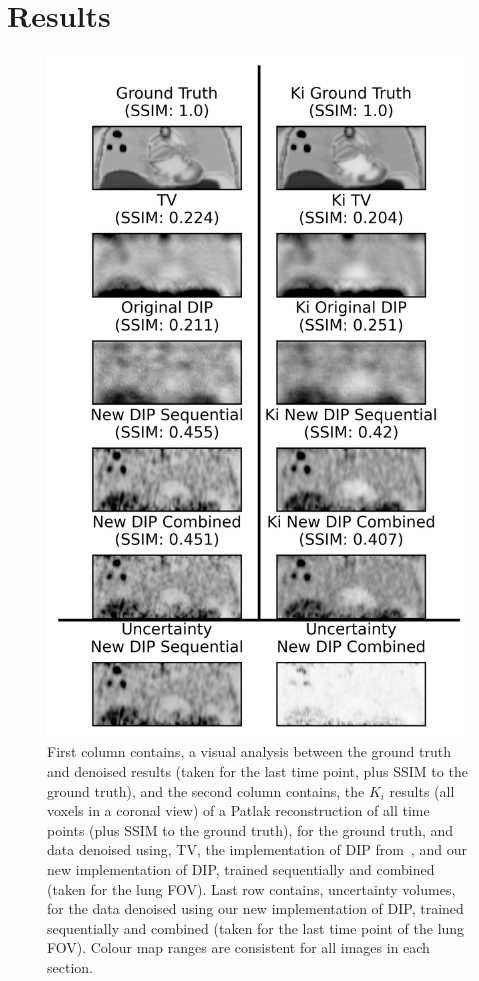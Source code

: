     \section{Results} \label{sec:pseudo_bayesian_dip_denoising_as_a_preprocessing_step_for_kinetic_modelling_in_dynamic_pet_appendix_results}
        \begin{figure}
            \centering
            
            \includegraphics[width=0.7\linewidth]{figures/deep_image_prior_results_visual_analysis.png}
            
            \captionsetup{singlelinecheck=false}
            \caption{
                First column contains, a visual analysis between the ground truth and denoised results (taken for the last time point, plus \gls{SSIM} to the ground truth), and the second column contains, the $K_i$ results (all voxels in a coronal view) of a Patlak reconstruction of all time points (plus \gls{SSIM} to the ground truth), for the ground truth, and data denoised using, \gls{TV}, the implementation of \gls{DIP} from~\parencite{Gong2019PETPrior}, and our new implementation of \gls{DIP}, trained sequentially and combined (taken for the lung \gls{FOV}). Last row contains, uncertainty volumes, for the data denoised using our new implementation of \gls{DIP}, trained sequentially and combined (taken for the last time point of the lung \gls{FOV}). Colour map ranges are consistent for all images in each section.
            }
            \label{fig:pseudo_bayesian_dip_denoising_as_a_preprocessing_step_for_kinetic_modelling_in_dynamic_pet_appendix_results_visual_analysis}
        \end{figure}
        
